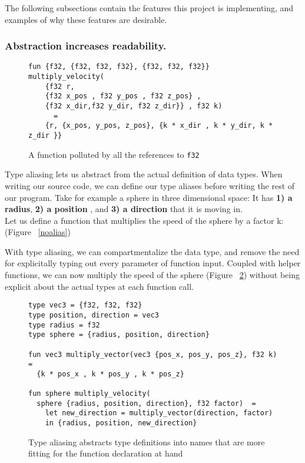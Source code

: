 The following subsections contain the features this project is implementing, and examples of why these features are desirable.
\subsubsection{Abstraction increases readability.} 
\begin{figure}
\begin{mdframed}
\begin{lstlisting}
fun {f32, {f32, f32, f32}, {f32, f32, f32}} multiply_velocity(
	{f32 r, 
	{f32 x_pos , f32 y_pos , f32 z_pos} , 
	{f32 x_dir,f32 y_dir, f32 z_dir}} , f32 k) 
	  =
    {r, {x_pos, y_pos, z_pos}, {k * x_dir , k * y_dir, k * z_dir }}
\end{lstlisting}
\caption{A function polluted by all the references to \texttt{f32} \label{noalias}}
\end{mdframed}
\label{noaliasing}
\end{figure}
Type aliasing lets us abstract from the actual definition of data types.
When writing our source code, we can define our type aliases before writing the
rest of our program. Take for example a sphere in three dimensional space:
It has \textbf{1) a radius}, \textbf{2) a position} , and \textbf{3) a direction} that it is
moving in.\\
Let us define a function that multiplies the speed of the sphere by a factor k: (Figure ~\ref{noalias})
\clearpage

With type aliasing, we can compartmentalize the data type, and remove the need
for explicitally typing out every parameter of function input.
Coupled with helper functions, we can now multiply the speed of the sphere (Figure ~\ref{sphere_example}) without being explicit about the actual types at each function call.
\begin{figure}
\begin{verbatim}
type vec3 = {f32, f32, f32}
type position, direction = vec3 
type radius = f32
type sphere = {radius, position, direction}

fun vec3 multiply_vector(vec3 {pos_x, pos_y, pos_z}, f32 k) =
  {k * pos_x , k * pos_y , k * pos_z}

fun sphere multiply_velocity(
  sphere {radius, position, direction}, f32 factor)  =
    let new_direction = multiply_vector(direction, factor)
    in {radius, position, new_direction}
\end{verbatim}
\caption{Type aliasing abstracts type definitions into names that are more
  fitting for the function declaration at hand \label{sphere_example}}
\end{figure}

